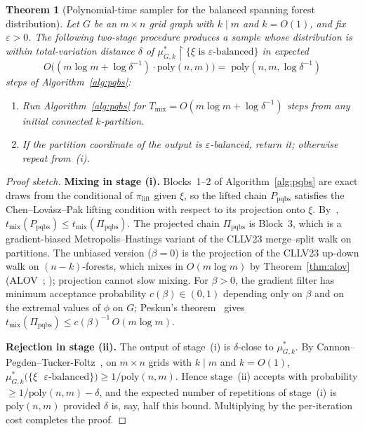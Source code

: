 \documentclass[11pt]{article}
\newtheorem{theorem}{Theorem}[section]
\begin{document}
\begin{theorem}[Polynomial-time sampler for the balanced
spanning forest distribution]\label{thm:pqbs-sampling}
Let $G$ be an $m \times n$ grid graph with $k \mid m$ and $k = O(1)$,
and fix $\varepsilon > 0$. The following two-stage procedure produces a
sample whose distribution is within total-variation distance $\delta$
of $\mu^*_{G,k}\!\restriction\!\{\xi\text{ is $\varepsilon$-balanced}\}$
in expected
\[
  O\bigl( (m\log m + \log \delta^{-1}) \cdot \mathrm{poly}(n,m) \bigr) =\;
  \mathrm{poly}(n,m,\log\delta^{-1})
\]
steps of Algorithm~\ref{alg:pqbs}:
\begin{enumerate}
  \item[(i)] Run Algorithm~\ref{alg:pqbs} for
    $T_{\mathrm{mix}} = O(m\log m + \log\delta^{-1})$ steps from any
    initial connected $k$-partition.
  \item[(ii)] If the partition coordinate of the output is
    $\varepsilon$-balanced, return it; otherwise repeat from~\textup{(i)}.
\end{enumerate}
\end{theorem}

\begin{proof}[Proof sketch]
\textbf{Mixing in stage (i).} Blocks~1--2 of Algorithm~\ref{alg:pqbs}
are exact draws from the conditional of $\pi_{\mathrm{lift}}$ given
$\xi$, so the lifted chain $P_{\mathrm{pqbs}}$ satisfies the
Chen--Lov\'asz--Pak lifting condition with respect to its projection
onto $\xi$. By~\cite[Theorem 1.2]{chen1999lifting},
\(
  t_{\mathrm{mix}}(P_{\mathrm{pqbs}}) \leq t_{\mathrm{mix}}(\Pi_{\mathrm{pqbs}}).
\)
The projected chain $\Pi_{\mathrm{pqbs}}$ is Block~3, which is a
gradient-biased Metropolis--Hastings variant of the CLLV23 merge--split
walk on partitions. The unbiased version ($\beta = 0$) is the
projection of the CLLV23 up-down walk on $(n-k)$-forests, which mixes in
$O(m\log m)$ by Theorem~\ref{thm:alov} (ALOV~\cite{anari2021logconcave};
\cite[Theorem 19, $c=0$]{charikar2023complexity}); projection cannot
slow mixing. For $\beta > 0$, the gradient filter has minimum acceptance
probability $c(\beta) \in (0,1)$ depending only on $\beta$ and on the
extremal values of $\phi$ on $G$; Peskun's theorem~\cite{peskun1973}
gives
\(
  t_{\mathrm{mix}}(\Pi_{\mathrm{pqbs}}) \leq c(\beta)^{-1}\, O(m\log m).
\)

\textbf{Rejection in stage (ii).} The output of stage~(i) is
$\delta$-close to $\mu^*_{G,k}$. By
Cannon--Pegden--Tucker-Foltz~\cite[Theorem 2]{cannon2024sampling}, on
$m \times n$ grids with $k \mid m$ and $k = O(1)$,
\(
  \mu^*_{G,k}\bigl(\{\xi\text{ $\varepsilon$-balanced}\}\bigr)
    \geq 1/\mathrm{poly}(n,m).
\)
Hence stage~(ii) accepts with probability $\geq 1/\mathrm{poly}(n,m) - \delta$,
and the expected number of repetitions of stage~(i) is $\mathrm{poly}(n,m)$
provided $\delta$ is, say, half this bound. Multiplying by the per-iteration
cost completes the proof.
\end{proof}
\end{document}

